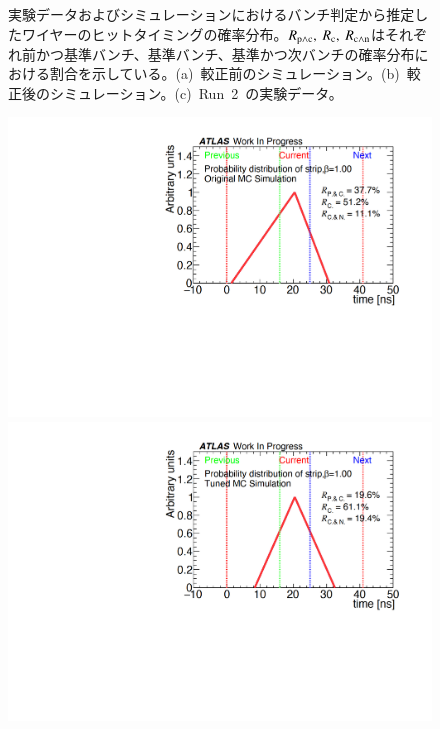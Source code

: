 \begin{figure}[tbp]
\begin{minipage}{0.33\hsize}
    \subcaption{}
    \end{minipage}
    \caption[実験データおよびシミュレーションにおけるバンチ判定から推定したワイヤーのヒットタイミングの確率分布]{実験データおよびシミュレーションにおけるバンチ判定から推定したワイヤーのヒットタイミングの確率分布。$R_{\rm{p{\land}c}},~R_{\rm{c}},~R_{\rm{c{\land}n}}$はそれぞれ前かつ基準バンチ、基準バンチ、基準かつ次バンチの確率分布における割合を示している。(a)~較正前のシミュレーション。(b)~較正後のシミュレーション。(c)~Run~2~の実験データ。}\label{fig:recall}
\end{figure}

\begin{figure}[tbp]
    \begin{minipage}{0.33\hsize}
    \centering   
    \includegraphics[width=\textwidth,page=1]{img/rec/rec_ori_s.pdf}
    \subcaption{}
    \end{minipage}
    \begin{minipage}{0.33\hsize}
    \centering   
    \includegraphics[width=\textwidth,page=1]{img/rec/rec_tune_s.pdf}

\end{minipage}
\end{figure}
